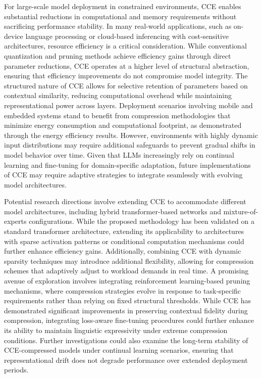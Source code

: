 \documentclass{article}
\begin{document}
For large-scale model deployment in constrained environments, CCE enables substantial reductions in computational and memory requirements without sacrificing performance stability. In many real-world applications, such as on-device language processing or cloud-based inferencing with cost-sensitive architectures, resource efficiency is a critical consideration. While conventional quantization and pruning methods achieve efficiency gains through direct parameter reductions, CCE operates at a higher level of structural abstraction, ensuring that efficiency improvements do not compromise model integrity. The structured nature of CCE allows for selective retention of parameters based on contextual similarity, reducing computational overhead while maintaining representational power across layers. Deployment scenarios involving mobile and embedded systems stand to benefit from compression methodologies that minimize energy consumption and computational footprint, as demonstrated through the energy efficiency results. However, environments with highly dynamic input distributions may require additional safeguards to prevent gradual shifts in model behavior over time. Given that LLMs increasingly rely on continual learning and fine-tuning for domain-specific adaptation, future implementations of CCE may require adaptive strategies to integrate seamlessly with evolving model architectures.

Potential research directions involve extending CCE to accommodate different model architectures, including hybrid transformer-based networks and mixture-of-experts configurations. While the proposed methodology has been validated on a standard transformer architecture, extending its applicability to architectures with sparse activation patterns or conditional computation mechanisms could further enhance efficiency gains. Additionally, combining CCE with dynamic sparsity techniques may introduce additional flexibility, allowing for compression schemes that adaptively adjust to workload demands in real time. A promising avenue of exploration involves integrating reinforcement learning-based pruning mechanisms, where compression strategies evolve in response to task-specific requirements rather than relying on fixed structural thresholds. While CCE has demonstrated significant improvements in preserving contextual fidelity during compression, integrating loss-aware fine-tuning procedures could further enhance its ability to maintain linguistic expressivity under extreme compression conditions. Further investigations could also examine the long-term stability of CCE-compressed models under continual learning scenarios, ensuring that representational drift does not degrade performance over extended deployment periods.
\end{document}
